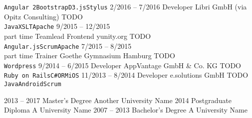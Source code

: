 \documentclass[9pt]{developercv} %
\begin{document}
\begin{entrylist}
{      \texttt{Angular 2}\slashsep\texttt{Bootstrap}\slashsep\texttt{D3.js}\slashsep\texttt{Stylus}
    }
  \entry
		{2/2016 -- 7/2016}
		{Developer}
		{Libri GmbH (via Opitz Consulting)}
		{
      TODO\\
      \texttt{Java}\slashsep\texttt{XSLT}\slashsep\texttt{Apache}
    }
  \entry
		{9/2015 -- 12/2015\\\footnotesize{part time}}
		{Teamlead Frontend}
		{yunity.org}
		{
      TODO\\
      \texttt{Angular.js}\slashsep\texttt{Scrum}\slashsep\texttt{Apache}
    }
  \entry
		{7/2015 -- 8/2015\\\footnotesize{part time}}
		{Trainer}
		{Goethe Gymnasium Hamburg}
		{
      TODO\\
      \texttt{Wordpress}
    }
  \entry
		{9/2014 -- 6/2015}
		{Developer}
		{AppVantage GmbH \& Co. KG}
		{
      TODO\\
      \texttt{Ruby on Rails}\slashsep\texttt{C#}\slashsep\texttt{ORM}\slashsep\texttt{iOS}
    }
  \entry
		{11/2013 -- 8/2014}
		{Developer}
		{e.solutions GmbH}
		{
      TODO\\
      \texttt{Java}\slashsep\texttt{Android}\slashsep\texttt{Scrum}
    }
\end{entrylist}



\begin{entrylist}
	\entry
		{2013 -- 2017}
		{Master's Degree}
		{Another University Name}
		{\lorem\lorem\lorem}
	\entry
		{2014}
		{Postgraduate Diploma}
		{A University Name}
		{\lorem\lorem}
	\entry
		{2007 -- 2013}
		{Bachelor's Degree}
		{A University Name}
		{\lorem\lorem}
\end{entrylist}

\end{document}
